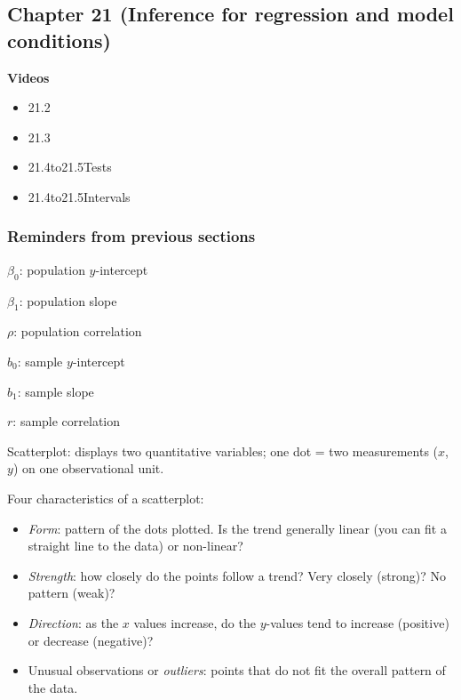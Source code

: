 \documentclass[
]{report}
\providecommand{\tightlist}{%
  \setlength{\itemsep}{0pt}\setlength{\parskip}{0pt}}
\begin{document}
\hypertarget{chapter-21-inference-for-regression-and-model-conditions}{%
\subsection*{Chapter 21 (Inference for regression and model conditions)}\label{chapter-21-inference-for-regression-and-model-conditions}}

\textbf{Videos}

\begin{itemize}
\tightlist
\item
  21.2
\item
  21.3
\item
  21.4to21.5Tests
\item
  21.4to21.5Intervals
\end{itemize}


\hypertarget{reminders-from-previous-sections-3}{%
\subsubsection*{Reminders from previous sections}\label{reminders-from-previous-sections-3}}

\(\beta_0\): population \(y\)-intercept

\(\beta_1\): population slope

\(\rho\): population correlation

\(b_0\): sample \(y\)-intercept

\(b_1\): sample slope

\(r\): sample correlation

Scatterplot: displays two quantitative variables; one dot = two measurements (\(x\), \(y\)) on one observational unit.

Four characteristics of a scatterplot:

\begin{itemize}
\tightlist
\item
  \emph{Form}: pattern of the dots plotted. Is the trend generally linear (you can fit a straight line to the data) or non-linear?\\
\item
  \emph{Strength}: how closely do the points follow a trend? Very closely (strong)? No pattern (weak)?\\
\item
  \emph{Direction}: as the \(x\) values increase, do the \(y\)-values tend to increase (positive) or decrease (negative)?\\
\item
  Unusual observations or \emph{outliers}: points that do not fit the overall pattern of the data.
\end{itemize}
\end{document}

